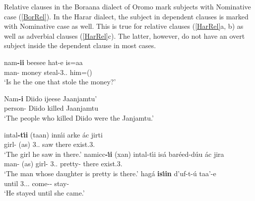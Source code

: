 Relative clauses in the Boraana dialect of Oromo mark subjects with Nominative  case (\ref{BorRel}).
In the Harar dialect, the subject in dependent clauses is marked with Nominative  case as well.
This is true for relative clauses (\ref{HarRel}a, b) as well as adverbial clauses (\ref{HarRel}c). 
The latter, however, do not have an overt subject inside the dependent clause in most cases.

\begin{exe}\ex\label{BorRel}
\begin{xlist}
\ex \gll nam\textbf{-ii} beesee hat-e is=aa\\
man-\nom{} money steal-3\sg{}.\mas{}.\pst{} him=\lin{}(\question{})\\
\glt `Is he the one that stole the money?'

\ex \gll Nam\textbf{-i} Diido ijeese Jaanjamtu'\\
person-\nom{} Diido killed Jaanjamtu\\
\glt `The people who killed Diido were the Janjamtu.' %
\end{xlist}
\end{exe}

\begin{exe} \ex\label{HarRel}
\begin{xlist}
\ex\gll intal\textbf{-t\'\i i} (taan) inn\'\i i arke \'ac jirti\\
girl-\nom{} (as) 3\sg{}.\mas{}.\nom{} saw there exist.3\sg{}.\fem{}\\
\glt`The girl he saw in there.'
\ex\gll namicc\textbf{-\'\i i} (xan) intal-t\'\i i is\'a bar\'eed-d\'uu \'ac jira\\
man-\nom{} (as) girl-\nom{} 3\sg{}.\mas{}.\acc{} pretty-\fem{} there exist.3\sg{}.\mas{}\\
\glt `The man whose daughter is pretty is there.'
\ex\gll hag\'a \textbf{is\'\i in} d'uf-t-\'u taa'-e\\
until 3.\sg{}.\fem{}.\nom{} come-\fem{}-\dep{} stay-\pst{}\\
\glt `He stayed until she came.'
\end{xlist}
\end{exe} 

